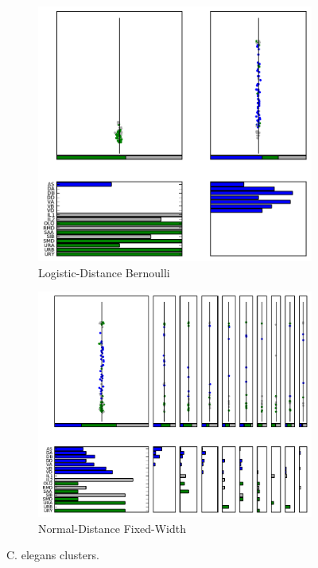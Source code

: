 \documentclass{article}
\begin{document}
\begin{figure}
  \centering 
  \begin{subfigure}[b]{0.45\textwidth}
    \includegraphics[width=\textwidth]{celegans/celegans.2r.ld.00.data-fixed_100_200-anneal_slow_400.0.clusters.pdf}
    \caption{Logistic-Distance Bernoulli}
    \label{fig:celegans:clusters:ld}
  \end{subfigure}
  \begin{subfigure}[b]{0.45\textwidth}
    \includegraphics[width=\textwidth]{celegans/celegans.2r.ndfw.00.data-fixed_100_200-anneal_slow_400.0.clusters.pdf}
    \caption{Normal-Distance Fixed-Width}
    \label{fig:celegans:clusters:ndfw}
  \end{subfigure}
  \caption{C. elegans clusters. }
  \label{fig:celegans:clusters}
\end{figure}
\end{document}
